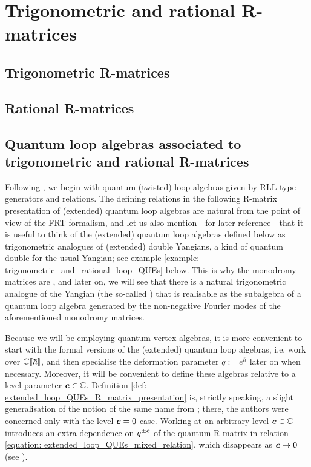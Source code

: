 \section{Trigonometric and rational R-matrices}
    \subsection{Trigonometric R-matrices}

    \subsection{Rational R-matrices}

    \subsection{Quantum loop algebras associated to trigonometric and rational R-matrices} \label{subsection: trigonometric_and_rational_loop_QUEs}
        Following \cite{guay_regelskis_wendlandt_R_matrix_presentation_of_loop_QUEs}, we begin with quantum (twisted) loop algebras given by RLL-type generators and relations. The defining relations in the following R-matrix presentation of (extended) quantum loop algebras are natural from the point of view of the FRT formalism, and let us also mention - for later reference - that it is useful to think of the (extended) quantum loop algebras defined below as trigonometric analogues of (extended) double Yangians, a kind of quantum double for the usual Yangian; see example \ref{example: trigonometric_and_rational_loop_QUEs} below. This is why the monodromy matrices are , and later on, we will see that there is a natural trigonometric analogue of the Yangian (the so-called ) that is realisable as the subalgebra of a quantum loop algebra generated by the non-negative Fourier modes of the aforementioned monodromy matrices.

        Because we will be employing quantum vertex algebras, it is more convenient to start with the formal versions of the (extended) quantum loop algebras, i.e. work over $\mathbb{C}[\![\hbar]\!]$, and then specialise the deformation parameter $q := e^{\hbar}$ later on when necessary. Moreover, it will be convenient to define these algebras relative to a level parameter $\boldsymbol{c} \in \mathbb{C}$. Definition \ref{def: extended_loop_QUEs_R_matrix_presentation} is, strictly speaking, a slight generalisation of the notion of the same name from \cite{guay_regelskis_wendlandt_R_matrix_presentation_of_loop_QUEs}; there, the authors were concerned only with the level $\boldsymbol{c} = 0$ case. Working at an arbitrary level $\boldsymbol{c} \in \mathbb{C}$ introduces an extra dependence on $q^{\pm \boldsymbol{c}}$ of the quantum R-matrix in relation \eqref{equation: extended_loop_QUEs_mixed_relation}, which disappears as $\boldsymbol{c} \to 0$ (see \cite[Remark 3.6]{guay_regelskis_wendlandt_R_matrix_presentation_of_loop_QUEs}).

